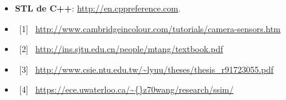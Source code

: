\begin{itemize}
	\item \textbf{STL de C++}: \url{http://en.cppreference.com}.
\item \ [1] \ \url{http://www.cambridgeincolour.com/tutorials/camera-sensors.htm}
\item \ [2] \ \url{http://ins.sjtu.edu.cn/people/mtang/textbook.pdf}
\item \ [3] \ \url{http://www.csie.ntu.edu.tw/~lyuu/theses/thesis\_r91723055.pdf}
\item \ [4] \ \url{https://ece.uwaterloo.ca/\~{}z70wang/research/ssim/}

\end{itemize}



